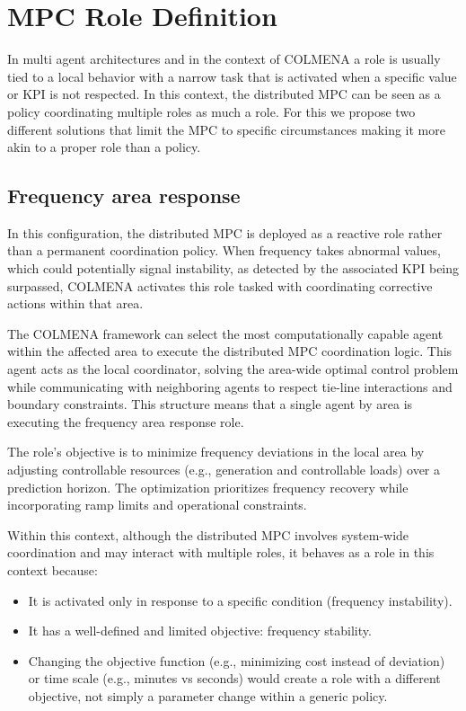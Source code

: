 \documentclass{article}
\begin{document}
\newpage
\section{MPC Role Definition}

In multi agent architectures and in the context of COLMENA a role is usually tied to a local behavior with a narrow task that is activated when a specific value or KPI is not respected. In this context, the distributed MPC can be seen as a policy coordinating multiple roles as much a role. For this we propose two different solutions that limit the MPC to specific circumstances making it more akin to a proper role than a policy.

\subsection{Frequency area response}

In this configuration, the distributed MPC is deployed as a reactive role rather than a permanent coordination policy. When frequency takes abnormal values, which could potentially signal instability, as detected by the associated KPI being surpassed, COLMENA activates this role tasked with coordinating corrective actions within that area.

The COLMENA framework can select the most computationally capable agent within the affected area to execute the distributed MPC coordination logic. This agent acts as the local coordinator, solving the area-wide optimal control problem while communicating with neighboring agents to respect tie-line interactions and boundary constraints. This structure means that a single agent by area is executing the frequency area response role.

The role's objective is to minimize frequency deviations in the local area by adjusting controllable resources (e.g., generation and controllable loads) over a prediction horizon. The optimization prioritizes frequency recovery while incorporating ramp limits and operational constraints.
 
Within this context, although the distributed MPC involves system-wide coordination and may interact with multiple roles, it behaves as a role in this context because:
\begin{itemize}
    \item It is activated only in response to a specific condition (frequency instability).
    \item It has a well-defined and limited objective: frequency stability.
    \item Changing the objective function (e.g., minimizing cost instead of deviation) or time scale (e.g., minutes vs seconds) would create a role with a different objective, not simply a parameter change within a generic policy.
\end{itemize}
\end{document}
